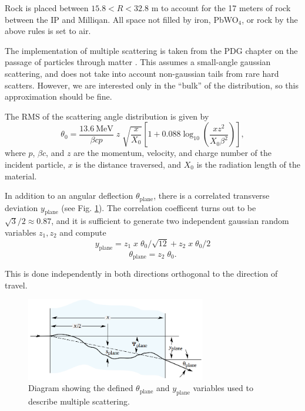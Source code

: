 \documentclass[12pt]{article}
\begin{document}
Rock is placed between $15.8 < R < 32.8$ m to account for the 17 meters of rock between the IP and Milliqan. All space not filled by
iron, PbWO$_4$, or rock by the above rules is set to air.

The implementation of multiple scattering is taken from the PDG chapter on the passage of particles through matter \cite{PDG_matter}.
This assumes a small-angle gaussian scattering, and does not take into account non-gaussian tails from rare hard scatters. However,
we are interested only in the ``bulk'' of the distribution, so this approximation should be fine.

The RMS of the scattering angle distribution is given by
\begin{equation}\label{eq:thrms}
\theta_0 = \frac{13.6~\text{MeV}}{\beta cp}\;z\;\sqrt{\frac{x}{X_0}}\left[1 + 0.088\log_{10}\left(\frac{xz^2}{X_0\beta^2}\right) \right],
\end{equation}
where $p$, $\beta c$, and $z$ are the momentum, velocity, and charge number of the incident particle, $x$ is the distance traversed, and 
$X_0$ is the radiation length of the material.

In addition to an angular deflection $\theta_\text{plane}$, there is a correlated transverse deviation $y_\text{plane}$ (see Fig. \ref{fig:mscangles}). The correlation coefficent
turns out to be $\sqrt{3}/2\approx0.87$, and it is sufficient to generate two independent gaussian random variables $z_1,z_2$ and compute
\begin{equation}\label{eq:msc}
y_\text{plane} = z_1\;x\;\theta_0/\sqrt{12} + z_2\;x\;\theta_0/2
\end{equation}
\[
\theta_\text{plane} = z_2\;\theta_0.
\]

This is done independently in both directions orthogonal to the direction of travel.

\begin{figure}
\centering
\includegraphics[width=0.7\textwidth]{plots/pdg_msc_diagram.png}
\caption{Diagram showing the defined $\theta_\text{plane}$ and $y_\text{plane}$ variables used to describe multiple scattering.}
\label{fig:mscangles}
\end{figure}
\end{document}
